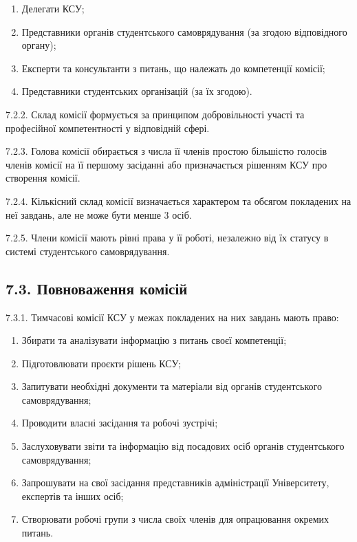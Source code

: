         \begin{enumerate}[label=\alph*)]
            \item Делегати КСУ;
            \item Представники органів студентського самоврядування (за згодою відповідного органу);
            \item Експерти та консультанти з питань, що належать до компетенції комісії;
            \item Представники студентських організацій (за їх згодою).
        \end{enumerate}

    7.2.2. Склад комісії формується за принципом добровільності участі та професійної компетентності у відповідній сфері.

    7.2.3. Голова комісії обирається з числа її членів простою більшістю голосів членів комісії на її першому засіданні або призначається рішенням КСУ про створення комісії.

    7.2.4. Кількісний склад комісії визначається характером та обсягом покладених на неї завдань, але не може бути менше 3 осіб.

    7.2.5. Члени комісії мають рівні права у її роботі, незалежно від їх статусу в системі студентського самоврядування.

\subsection*{7.3. Повноваження комісій}
    7.3.1. Тимчасові комісії КСУ у межах покладених на них завдань мають право:

        \begin{enumerate}[label=\alph*)]
            \item Збирати та аналізувати інформацію з питань своєї компетенції;
            \item Підготовлювати проєкти рішень КСУ;
            \item Запитувати необхідні документи та матеріали від органів студентського самоврядування;
            \item Проводити власні засідання та робочі зустрічі;
            \item Заслуховувати звіти та інформацію від посадових осіб органів студентського самоврядування;
            \item Запрошувати на свої засідання представників адміністрації Університету, експертів та інших осіб;
            \item Створювати робочі групи з числа своїх членів для опрацювання окремих питань.
        \end{enumerate}

